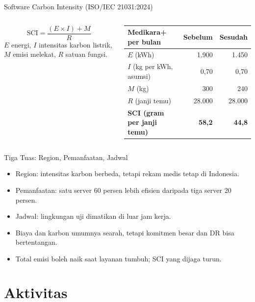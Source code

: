 \documentclass[aspectratio=169, table, 12pt]{beamer}
\begin{document}
\begin{frame}{{\Large Software Carbon Intensity (ISO/IEC 21031:2024)}}
  \begin{columns}[c]
    \[
      \mathrm{SCI} = \frac{(E \times I) + M}{R}
    \]
    \small
    $E$ energi, $I$ intensitas karbon listrik, $M$ emisi melekat, $R$ satuan
    fungsi.

    \scriptsize
    \begin{tabularx}{\linewidth}{>{\raggedright\arraybackslash}X r r}
      \hline
      \textbf{Medikara+ per bulan} & \textbf{Sebelum} & \textbf{Sesudah} \\
      \hline
      $E$ (kWh) & 1.900 & 1.450 \\
      \hline
      $I$ (kg per kWh, asumsi) & 0,70 & 0,70 \\
      \hline
      $M$ (kg) & 300 & 240 \\
      \hline
      $R$ (janji temu) & 28.000 & 28.000 \\
      \hline
      \textbf{SCI (gram per janji temu)} & \textbf{58,2} & \textbf{44,8} \\
      \hline
    \end{tabularx}
  \end{columns}
\end{frame}

\begin{frame}{{\Large Tiga Tuas: Region, Pemanfaatan, Jadwal}}
  \vspace{10pt}
  \begin{itemize}
    \item Region: intensitas karbon berbeda, tetapi rekam medis tetap di
          Indonesia.
    \item Pemanfaatan: satu server 60 persen lebih efisien daripada tiga server
          20 persen.
    \item Jadwal: lingkungan uji dimatikan di luar jam kerja.
    \item Biaya dan karbon umumnya searah, tetapi komitmen besar dan DR bisa
          bertentangan.
    \item Total emisi boleh naik saat layanan tumbuh; SCI yang dijaga turun.
  \end{itemize}
\end{frame}

\section{Aktivitas}
\end{document}
